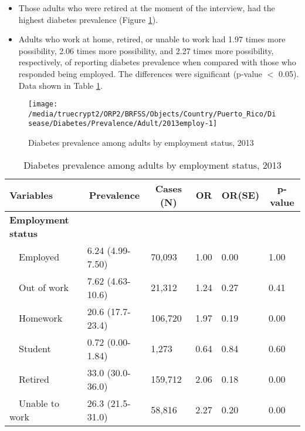  
 \newpage
\begin{itemize}


\item Those adults who were 
retired at the moment of the interview, had the highest diabetes prevalence (Figure \ref{fig:employ.Diabetes.2013}).

\item Adults who work at home, retired, or unable to work had 1.97 times more possibility, 2.06 times more possibility, and 2.27 times more possibility, respectively, of reporting diabetes prevalence when compared with those who responded being employed. The differences were significant (p-value $<$ 0.05). 
Data shown in Table \ref{tab:employ.Diabetes.2013}.

\end{itemize}

\begin{figure}[H]
\caption{Diabetes prevalence among adults by employment status, 
         2013}
\label{fig:employ.Diabetes.2013}
\begin{knitrout}
\color{fgcolor}

{\centering \texttt{[image: /media/truecrypt2/ORP2/BRFSS/Objects/Country/Puerto\_Rico/Disease/Diabetes/Prevalence/Adult/2013employ-1]} 

}



\end{knitrout}
 \end{figure}

\begin{table}[H]
\caption{Diabetes prevalence  among adults by employment status, 2013\label{tab:employ.Diabetes.2013}} 
\begin{center}
\begin{tabular}{llllll}
\hline\hline
\multicolumn{1}{l}{Variables}&\multicolumn{1}{c}{Prevalence}&\multicolumn{1}{c}{Cases (N)}&\multicolumn{1}{c}{OR}&\multicolumn{1}{c}{OR(SE)}&\multicolumn{1}{c}{p-value}\tabularnewline
\hline
{\bfseries Employment status}&&&&&\tabularnewline
~~Employed&6.24 (4.99-7.50)& 70,093&1.00&0.00&1.00\tabularnewline
~~Out of work&7.62 (4.63-10.6)& 21,312&1.24&0.27&0.41\tabularnewline
~~Homework&20.6 (17.7-23.4)&106,720&1.97&0.19&0.00\tabularnewline
~~Student&0.72 (0.00-1.84)&  1,273&0.64&0.84&0.60\tabularnewline
~~Retired&33.0 (30.0-36.0)&159,712&2.06&0.18&0.00\tabularnewline
~~Unable to work&26.3 (21.5-31.0)& 58,816&2.27&0.20&0.00\tabularnewline
\hline
\end{tabular}\end{center}

\end{table}


